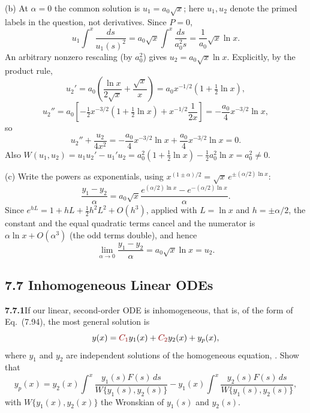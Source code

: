 (b) At $\alpha=0$ the common solution is $u_1=a_0\sqrt x$;
here $u_1,u_2$ denote the primed labels in the question, not derivatives.
Since $P=0$,
\[
u_1\int^x\frac{ds}{u_1(s)^2}
=a_0\sqrt x\int^x\frac{ds}{a_0^2s}
=\frac1{a_0}\sqrt x\ln x.
\]
An arbitrary nonzero rescaling (by $a_0^2$) gives
$\boxed{u_2=a_0\sqrt x\ln x}$. Explicitly, by the product rule,
\[
u_2'=a_0\left(\frac{\ln x}{2\sqrt x}+\frac{\sqrt x}x\right)
=a_0x^{-1/2}(1+\tfrac12\ln x),
\]
\[
u_2''=a_0\left[-\tfrac12x^{-3/2}(1+\tfrac12\ln x)
+x^{-1/2}\frac1{2x}\right]
=-\frac{a_0}{4}x^{-3/2}\ln x,
\]
so
\[
u_2''+\frac{u_2}{4x^2}=-\frac{a_0}4x^{-3/2}\ln x+\frac{a_0}4x^{-3/2}\ln x=0.
\]
Also $W(u_1,u_2)=u_1u_2'-u_1'u_2
=a_0^2(1+\tfrac12\ln x)-\tfrac12a_0^2\ln x=a_0^2\ne0$.

(c) Write the powers as exponentials, using
$x^{(1\pm\alpha)/2}=\sqrt x\,e^{\pm(\alpha/2)\ln x}$:
\[
\frac{y_1-y_2}{\alpha}
=a_0\sqrt x\frac{e^{(\alpha/2)\ln x}-e^{-(\alpha/2)\ln x}}\alpha.
\]
Since $e^{hL}=1+hL+\tfrac12h^2L^2+O(h^3)$, applied with $L=\ln x$ and
$h=\pm\alpha/2$, the constant and the equal quadratic terms cancel and
the numerator is $\alpha\ln x+O(\alpha^3)$ (the odd terms double), and
hence
\[
\boxed{\lim_{\alpha\to0}\frac{y_1-y_2}{\alpha}
=a_0\sqrt x\ln x=u_2}.
\]

\subsection*{7.7 Inhomogeneous Linear ODEs}

\par\bigskip
\noindent\textbf{7.7.1}\quad If our linear, second-order ODE is inhomogeneous,
that is, of the form of Eq.~(7.94), the most general solution is
\[
y(x)=\erratum{C_1}y_{1}(x)+\erratum{C_2}y_{2}(x)+y_{p}(x),
\]
where $y_{1}$ and $y_{2}$ are independent solutions of the homogeneous
equation, . Show that
\[
y_{p}(x)=y_{2}(x)\int^{x}\frac{y_{1}(s)F(s)\,ds}{W\{y_{1}(s),y_{2}(s)\}}
-y_{1}(x)\int^{x}\frac{y_{2}(s)F(s)\,ds}{W\{y_{1}(s),y_{2}(s)\}},
\]
with $W\{y_{1}(x),y_{2}(x)\}$ the Wronskian of $y_{1}(s)$ and $y_{2}(s)$.

